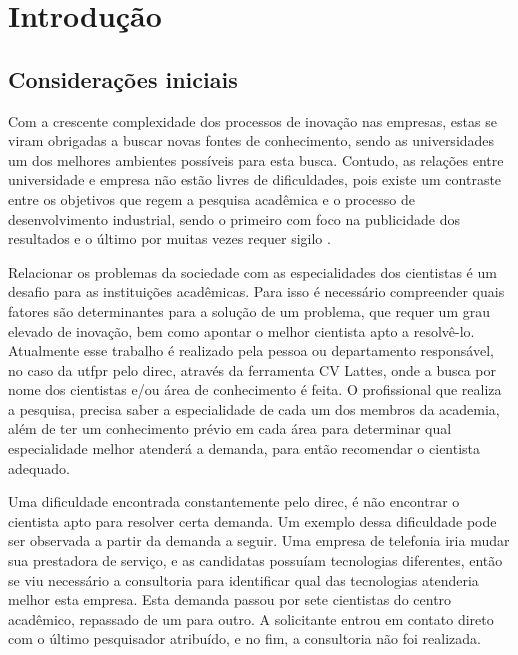 \chapter{Introdução}\label{cap:introducao}

\section{Considerações iniciais}\label{sec:consideracoesIniciais}

Com a crescente complexidade dos processos de inovação nas empresas, estas se viram obrigadas a buscar novas fontes de conhecimento, sendo as universidades um dos melhores ambientes possíveis para esta busca. Contudo, as relações entre universidade e empresa não estão livres de dificuldades, pois existe um contraste entre os objetivos que regem a pesquisa acadêmica e o processo de desenvolvimento industrial, sendo o primeiro com foco na publicidade dos resultados e o último por muitas vezes requer sigilo \cite{UnicampIE}. 

Relacionar os problemas da sociedade com as especialidades dos cientistas é um desafio para as instituições acadêmicas. Para isso é necessário compreender quais fatores são determinantes para a solução de um problema, que requer um grau elevado de inovação, bem como apontar o melhor cientista apto a resolvê-lo. Atualmente esse trabalho é realizado pela pessoa ou departamento responsável, no caso da \gls{utfpr} pelo \gls{direc}, através da ferramenta CV Lattes, onde a busca por nome dos cientistas e/ou área de conhecimento é feita. O profissional que realiza a pesquisa, precisa saber a especialidade de cada um dos membros da academia, além de ter um conhecimento prévio em cada área para determinar qual especialidade melhor atenderá a demanda, para então recomendar o cientista adequado.

Uma dificuldade encontrada constantemente pelo \gls{direc}, é não encontrar o cientista apto para resolver certa demanda. Um exemplo dessa dificuldade pode ser observada a partir da demanda a seguir. Uma empresa de telefonia iria mudar sua prestadora de serviço, e as candidatas possuíam tecnologias diferentes, então se viu necessário a consultoria para identificar qual das tecnologias atenderia melhor esta empresa. Esta demanda passou por sete cientistas do centro acadêmico, repassado de um para outro. A solicitante entrou em contato direto com o último pesquisador atribuído, e no fim, a consultoria não foi realizada.

